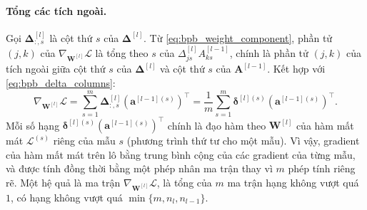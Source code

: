 \paragraph{Tổng các tích ngoài.} %
Gọi $\boldsymbol{\Delta}^{[l]}_{:,s}$ là cột thứ $s$ của $\boldsymbol{\Delta}^{[l]}$. Từ \eqref{eq:bpb_weight_component}, phần tử $(j,k)$ của $\nabla_{\mathbf{W}^{[l]}}\mathcal{L}$ là tổng theo $s$ của $\Delta_{js}^{[l]}A_{ks}^{[l-1]}$, chính là phần tử $(j,k)$ của tích ngoài giữa cột thứ $s$ của $\boldsymbol{\Delta}^{[l]}$ và cột thứ $s$ của $\mathbf{A}^{[l-1]}$. Kết hợp với \eqref{eq:bpb_delta_columns}:
\begin{equation}
\nabla_{\mathbf{W}^{[l]}}\mathcal{L} = \sum_{s=1}^{m}\boldsymbol{\Delta}^{[l]}_{:,s}\left(\mathbf{a}^{[l-1](s)}\right)^{\top} = \frac{1}{m}\sum_{s=1}^{m}\boldsymbol{\delta}^{[l](s)}\left(\mathbf{a}^{[l-1](s)}\right)^{\top}.
\label{eq:bpb_weight_sum_outer}
\end{equation}
Mỗi số hạng $\boldsymbol{\delta}^{[l](s)}\left(\mathbf{a}^{[l-1](s)}\right)^{\top}$ chính là đạo hàm theo $\mathbf{W}^{[l]}$ của hàm mất mát $\mathcal{L}^{(s)}$ riêng của mẫu $s$ (phương trình thứ tư cho một mẫu). Vì vậy, gradient của hàm mất mát trên lô bằng trung bình cộng của các gradient của từng mẫu, và được tính đồng thời bằng một phép nhân ma trận thay vì $m$ phép tính riêng rẽ. Một hệ quả là ma trận $\nabla_{\mathbf{W}^{[l]}}\mathcal{L}$, là tổng của $m$ ma trận hạng không vượt quá $1$, có hạng không vượt quá $\min\{m, n_l, n_{l-1}\}$.
 
